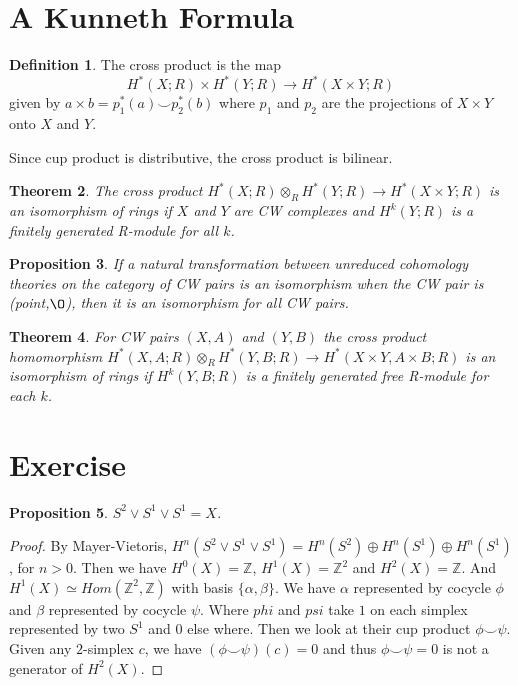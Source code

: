 \documentclass[psamsfonts]{amsart}
\newtheorem{theorem}{Theorem}[section]
\newtheorem{prop}[theorem]{Proposition}
\theoremstyle{definition}
\newtheorem{defn}[theorem]{Definition}
\theoremstyle{remark}
\numberwithin{equation}{section}
\begin{document}
	\section{A Kunneth Formula}
		\begin{defn}
			The cross product is the map 
			\begin{equation}
				H^*(X;R) \times H^*(Y;R) \to H^*(X\times Y;R)
			\end{equation}
			given by $a \times b = p_1^*(a) \smile p_2^*(b)$ where $p_1$ and $p_2$ are the projections of $X \times Y$ onto $X$ and $Y$.
		\end{defn}
		Since cup product is distributive, the cross product is bilinear.
		\begin{theorem}
			The cross product $H^*(X;R) \otimes_R H^*(Y;R) \to H^*(X \times Y; R)$ is an isomorphism of rings if $X$ and $Y$ are CW complexes and $H^k(Y;R)$ is a finitely generated R-module for all $k$.
		\end{theorem}
		
		 \begin{prop}
		 	If a natural transformation between unreduced cohomology theories on the category of CW pairs is an isomorphism when the CW pair is (point,$\O$), then it is an isomorphism for all CW pairs.
		 \end{prop}
		 \begin{theorem}
		 	For CW pairs $(X,A)$ and $(Y,B)$ the cross product homomorphism $H^*(X,A;R) \otimes_R H^*(Y,B;R) \to H^*(X\times Y, A \times B ;R)$ is an isomorphism of rings if $H^k(Y,B;R)$ is a finitely generated free R-module for each $k$.
		 \end{theorem}
	\section{Exercise}
		\begin{prop}
			$S^2 \vee S^1 \vee S^1 = X$.
		\end{prop}
		\begin{proof}
			By Mayer-Vietoris, $H^n(S^2 \vee S^1 \vee S^1) = H^n(S^2) \oplus H^n(S^1) \oplus H^n(S^1)$, for $n > 0$. Then we have $H^0(X) = \mathbb{Z}$, $H^1(X) = \mathbb{Z}^2$ and $H^2(X) = \mathbb{Z}$. And $H^1(X) \simeq Hom(\mathbb{Z}^2,\mathbb{Z})$ with basis $\{ \alpha, \beta \}$. We have $\alpha$ represented by cocycle $\phi$ and $\beta$ represented by cocycle $\psi$. Where $phi$ and $psi$ take $1$ on each simplex represented by two $S^1$ and $0$ else where. Then we look at their cup product $\phi \smile \psi$. Given any $2$-simplex $c$, we have $(\phi \smile \psi)(c) = 0$ and thus $\phi \smile \psi = 0$ is not a generator of $H^2(X)$.
		\end{proof}
\end{document}
